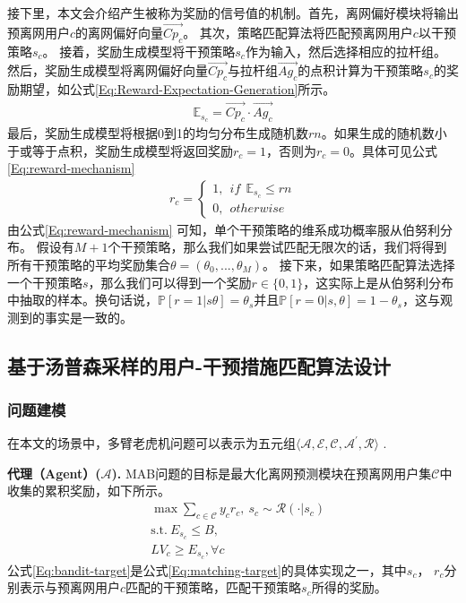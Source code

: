 	接下里，本文会介绍产生被称为奖励的信号值的机制。首先，离网偏好模块将输出预离网用户$c$的离网偏好向量$\vec{Cp_{c}}$。
	其次，策略匹配算法将匹配预离网用户$c$以干预策略$s_{c}$。
	接着，奖励生成模型将干预策略$s_{c}$作为输入，然后选择相应的拉杆组。
	然后，奖励生成模型将离网偏好向量$\vec{Cp_{c}}$与拉杆组$\vec{Ag_{c}}$的点积计算为干预策略$s_{c}$的奖励期望，如公式\eqref{Eq:Reward-Expectation-Generation}所示。	 
\begin{equation}
	\begin{aligned}
		\mathbb{E}_{s_{c}} = \vec{Cp_{c}} \cdot \vec{Ag_{c}}
	\end{aligned}
	\label{Eq:Reward-Expectation-Generation}
\end{equation}
最后，奖励生成模型将根据0到1的均匀分布生成随机数$rn$。如果生成的随机数小于或等于点积，奖励生成模型将返回奖励$r_{c}=1$，否则为$r_{c}=0$。具体可见公式\eqref{Eq:reward-mechanism} 
\begin{equation}
	\begin{aligned}
		r_{c} = 
		\begin{cases}
			1, ~~if ~~ \mathbb{E}_{s_{c}} \leq rn \\
			0 ,~~otherwise
		\end{cases}
	\end{aligned}
	\label{Eq:reward-mechanism}
\end{equation}		
由公式\eqref{Eq:reward-mechanism} 可知，单个干预策略的维系成功概率服从伯努利分布。
假设有$M+1$个干预策略，那么我们如果尝试匹配无限次的话，我们将得到所有干预策略的平均奖励集合$\theta = (\theta_{0}, ..., \theta_{M})$。
接下来，如果策略匹配算法选择一个干预策略$s$，那么我们可以得到一个奖励$r \in \{0, 1\}$，这实际上是从伯努利分布中抽取的样本。换句话说，$\mathbb{P}[r=1|s \theta] = \theta_{s} $并且$\mathbb{P}[r=0|s, \theta] = 1-\theta_{s} $，这与观测到的事实是一致的。


\subsection{基于汤普森采样的用户-干预措施匹配算法设计}
\subsubsection{问题建模}
	在本文的场景中，多臂老虎机问题可以表示为五元组$\langle \mathcal{A}, \mathcal{E}, \mathcal{C}, \mathcal{A}^{'}, \mathcal{R}\rangle$ . \par
	\textbf{代理（Agent）($\mathcal{A}$).}  
	MAB问题的目标是最大化离网预测模块在预离网用户集$\mathcal{C}$中收集的累积奖励，如下所示。
	\begin{equation}
		\begin{aligned}
			& \max \sum_{c \in \mathcal{C}} y_{c} r_{c}, ~ s_{c} \sim \mathcal{R}(\cdot|s_{c}) \\
			& \mathrm{s.t.} ~ E_{s_{c}} \leq B ,\\
			& LV_{c} \geq E_{s_{c}}, \forall c			
		\end{aligned}
		\label{Eq:bandit-target}
	\end{equation}		
	公式\eqref{Eq:bandit-target}是公式\eqref{Eq:matching-target}的具体实现之一，其中$s_{c}$， $r_{c}$分别表示与预离网用户${c}$匹配的干预策略，匹配干预策略$s_{c}$所得的奖励。

